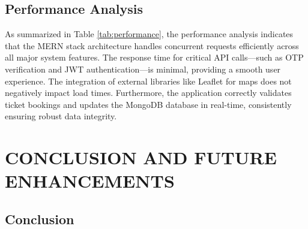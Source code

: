 \documentclass[12pt]{report}
\begin{document}
\newpage
\section{Performance Analysis}

\renewcommand{\arraystretch}{1.5}

As summarized in Table \ref{tab:performance}, the performance analysis indicates that the MERN stack architecture handles concurrent requests efficiently across all major system features. The response time for critical API calls—such as OTP verification and JWT authentication—is minimal, providing a smooth user experience. The integration of external libraries like Leaflet for maps does not negatively impact load times. Furthermore, the application correctly validates ticket bookings and updates the MongoDB database in real-time, consistently ensuring robust data integrity.

\begin{table}[H]
\centering
{}
\caption{System Performance Analysis Metrics for Core Application Features}
\label{tab:performance}
\end{table}


\chapter{CONCLUSION AND FUTURE ENHANCEMENTS} 
\linespread{1.5} 

\section{Conclusion} 
\end{document}
